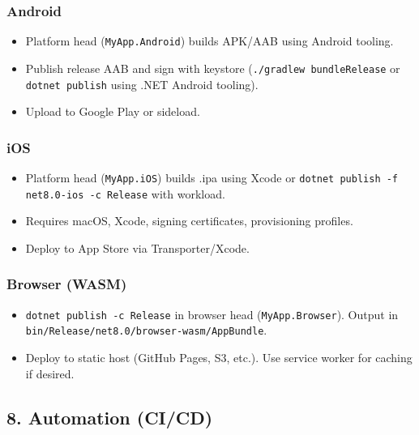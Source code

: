 \subsubsection{Android}\label{android-1}

\begin{itemize}
\tightlist
\item
  Platform head (\passthrough{\lstinline!MyApp.Android!}) builds APK/AAB
  using Android tooling.
\item
  Publish release AAB and sign with keystore
  (\passthrough{\lstinline!./gradlew bundleRelease!} or
  \passthrough{\lstinline!dotnet publish!} using .NET Android tooling).
\item
  Upload to Google Play or sideload.
\end{itemize}

\subsubsection{iOS}\label{ios-1}

\begin{itemize}
\tightlist
\item
  Platform head (\passthrough{\lstinline!MyApp.iOS!}) builds .ipa using
  Xcode or
  \passthrough{\lstinline!dotnet publish -f net8.0-ios -c Release!} with
  workload.
\item
  Requires macOS, Xcode, signing certificates, provisioning profiles.
\item
  Deploy to App Store via Transporter/Xcode.
\end{itemize}

\subsubsection{Browser (WASM)}\label{browser-wasm}

\begin{itemize}
\tightlist
\item
  \passthrough{\lstinline!dotnet publish -c Release!} in browser head
  (\passthrough{\lstinline!MyApp.Browser!}). Output in
  \passthrough{\lstinline!bin/Release/net8.0/browser-wasm/AppBundle!}.
\item
  Deploy to static host (GitHub Pages, S3, etc.). Use service worker for
  caching if desired.
\end{itemize}

\subsection{8. Automation (CI/CD)}\label{automation-cicd}

